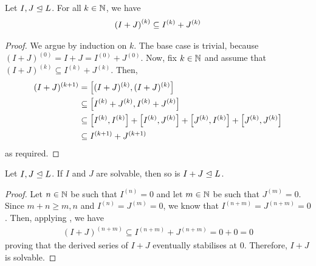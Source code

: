 \begin{boxlemma}\label{Ch1:Lemma:DerivedSeries_sum_contained_sum_derivedSeries}
    Let $I, J \trianglelefteq L$. For all $k \in \mathbb{N}$, we have
    \begin{align*}
        \left( I + J \right)^{(k)} \subseteq I^{(k)} + J^{(k)}
    \end{align*}
\end{boxlemma}
\begin{proof}
    We argue by induction on $k$. The base case is trivial, because $(I + J)^{(0)} = I + J = I^{(0)} + J^{(0)}$. Now, fix $k \in \mathbb{N}$ and assume that $(I + J)^{(k)} \subseteq I^{(k)} + J^{(k)}$. Then,
    \begin{align*}
        (I + J)^{(k + 1)} &= \left[ (I + J)^{(k)}, (I + J)^{(k)} \right] \\
        &\subseteq \left[ I^{(k)} + J^{(k)}, I^{(k)} + J^{(k)} \right] \\
        &\subseteq \left[ I^{(k)}, I^{(k)} \right] + \left[ I^{(k)}, J^{(k)} \right] + \left[ J^{(k)}, I^{(k)} \right] + \left[ J^{(k)}, J^{(k)} \right] \\
        &\subseteq I^{(k + 1)} + J^{(k + 1)}
    \end{align*}
    as required.
\end{proof}

\begin{boxlemma}\label{Ch1:Lemma:SumIdealSolvable}
    Let $I, J \trianglelefteq L$. If $I$ and $J$ are solvable, then so is $I + J \trianglelefteq L$.
\end{boxlemma}
\begin{proof}
    Let $n \in \mathbb{N}$ be such that $I^{(n)} = 0$ and let $m \in \mathbb{N}$ be such that $J^{(m)} = 0$. Since $m + n \geq m, n$ and $I^{(n)} = J^{(m)} = 0$, we know that $I^{(n + m)} = J^{(n + m)} = 0$. Then, applying , we have
    \begin{align*}
        (I + J)^{(n + m)} \subseteq I^{(n + m)} + J^{(n + m)} = 0 + 0 = 0
    \end{align*}
    proving that the derived series of $I + J$ eventually stabilises at $0$. Therefore, $I + J$ is solvable.
\end{proof}

